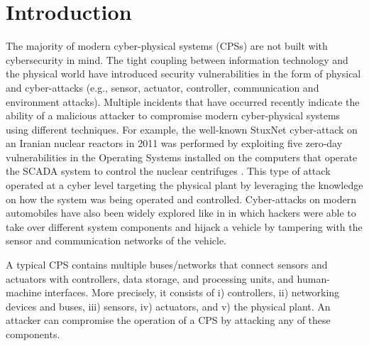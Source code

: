 \documentclass[letterpaper, 10 pt, conference]{ieeeconf}  %
\newcommand\NB[1]{$\spadesuit$\footnote{NB: #1}}
\begin{document}
\section{Introduction}
The majority of modern cyber-physical systems (CPSs) are not built with cybersecurity in mind. The tight coupling between information technology and the physical world have introduced security vulnerabilities in the form of physical and cyber-attacks (e.g., sensor, actuator, controller, communication and environment attacks).
Multiple incidents that have occurred recently indicate the ability of a malicious attacker to compromise modern cyber-physical systems using different techniques. For example, the well-known StuxNet cyber-attack on an Iranian nuclear reactors in 2011 was performed by exploiting five zero-day vulnerabilities in the Operating Systems installed on the computers that operate the SCADA system to control the nuclear centrifuges \cite{langner_2013}. This type of attack operated at a cyber level targeting the physical plant by leveraging the knowledge on how the system was being operated and controlled. Cyber-attacks on modern automobiles have also been widely explored like in \cite{miller} in which hackers were able to take over different system components and hijack a vehicle by tampering with the sensor and communication networks of the vehicle.

A typical CPS contains multiple buses/networks that connect sensors and actuators with controllers, data storage, and processing units, and human-machine interfaces. More precisely, it consists of i) controllers, ii) networking devices and buses, iii) sensors, iv) actuators, and v) the physical plant. An attacker can compromise the operation of a CPS by attacking any of these components. 
\end{document}
